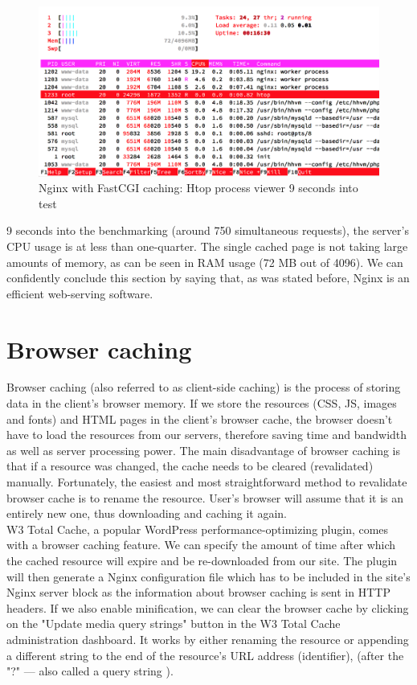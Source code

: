 \begin{figure}[H]
\begin{center}
\includegraphics[scale=0.5]{figures/Nginx_FastCGI_caching_9s.png}
\caption{Nginx with FastCGI caching: Htop process viewer 9 seconds into test}
\label{fig:nginx_fastcgi_caching}
\end{center}
\end{figure}

9 seconds into the benchmarking (around 750 simultaneous requests), the server's CPU usage is at less than one-quarter. The single cached page is not taking large amounts of memory, as can be seen in RAM usage (72 MB out of 4096). We can confidently conclude this section by saying that, as was stated before, Nginx is an efficient web-serving software.

\section{Browser caching}

Browser caching (also referred to as client-side caching) is the process of storing data in the client's browser memory. If we store the resources (CSS, JS, images and fonts) and HTML pages in the client's browser cache, the browser doesn't have to load the resources from our servers, therefore saving time and bandwidth as well as server processing power. The main disadvantage of browser caching is that if a resource was changed, the cache needs to be cleared (revalidated) manually. Fortunately, the easiest and most straightforward method to revalidate browser cache is to rename the resource. User's browser will assume that it is an entirely new one, thus downloading and caching it again. \\

W3 Total Cache, a popular WordPress performance-optimizing plugin, comes with a browser caching feature. We can specify the amount of time after which the cached resource will expire and be re-downloaded from our site. The plugin will then generate a Nginx configuration file which has to be included in the site's Nginx server block \cite{Nginx:server_block} as the information about browser caching is sent in HTTP headers. If we also enable minification, we can clear the browser cache by clicking on the "Update media query strings" button in the W3 Total Cache administration dashboard. It works by either renaming the resource or appending a different string to the end of the resource's URL address (identifier), (after the "?" — also called a query string \cite{Wiki:Query-string}). \\

